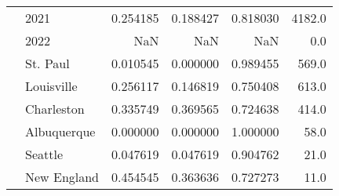 \begin{tabular}{llrrrr}
     & 2021 &        0.254185 &               0.188427 &  0.818030 &   4182.0 \\
     & 2022 &             NaN &                    NaN &       NaN &      0.0 \\
     & St. Paul &        0.010545 &               0.000000 &  0.989455 &    569.0 \\
     & Louisville &        0.256117 &               0.146819 &  0.750408 &    613.0 \\
     & Charleston &        0.335749 &               0.369565 &  0.724638 &    414.0 \\
     & Albuquerque &        0.000000 &               0.000000 &  1.000000 &     58.0 \\
     & Seattle &        0.047619 &               0.047619 &  0.904762 &     21.0 \\
     & New England &        0.454545 &               0.363636 &  0.727273 &     11.0 \\
\bottomrule
\end{tabular}
